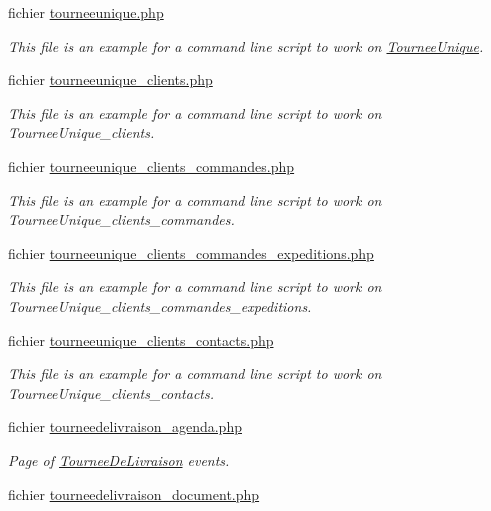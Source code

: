 \begin{DoxyCompactItemize}
fichier \hyperlink{scripts_2tourneeunique_8php}{tourneeunique.\+php}
\begin{DoxyCompactList}\small\item\em This file is an example for a command line script to work on \hyperlink{classTourneeUnique}{Tournee\+Unique}. \end{DoxyCompactList}\item 
fichier \hyperlink{tourneeunique__clients_8php}{tourneeunique\+\_\+clients.\+php}
\begin{DoxyCompactList}\small\item\em This file is an example for a command line script to work on Tournee\+Unique\+\_\+clients. \end{DoxyCompactList}\item 
fichier \hyperlink{tourneeunique__clients__commandes_8php}{tourneeunique\+\_\+clients\+\_\+commandes.\+php}
\begin{DoxyCompactList}\small\item\em This file is an example for a command line script to work on Tournee\+Unique\+\_\+clients\+\_\+commandes. \end{DoxyCompactList}\item 
fichier \hyperlink{tourneeunique__clients__commandes__expeditions_8php}{tourneeunique\+\_\+clients\+\_\+commandes\+\_\+expeditions.\+php}
\begin{DoxyCompactList}\small\item\em This file is an example for a command line script to work on Tournee\+Unique\+\_\+clients\+\_\+commandes\+\_\+expeditions. \end{DoxyCompactList}\item 
fichier \hyperlink{tourneeunique__clients__contacts_8php}{tourneeunique\+\_\+clients\+\_\+contacts.\+php}
\begin{DoxyCompactList}\small\item\em This file is an example for a command line script to work on Tournee\+Unique\+\_\+clients\+\_\+contacts. \end{DoxyCompactList}\item 
fichier \hyperlink{tourneedelivraison__agenda_8php}{tourneedelivraison\+\_\+agenda.\+php}
\begin{DoxyCompactList}\small\item\em Page of \hyperlink{classTourneeDeLivraison}{Tournee\+De\+Livraison} events. \end{DoxyCompactList}\item 
fichier \hyperlink{tourneedelivraison__document_8php}{tourneedelivraison\+\_\+document.\+php}

\end{DoxyCompactItemize}
